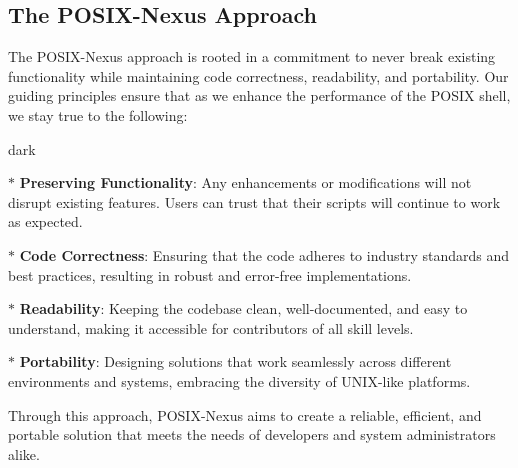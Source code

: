 \subsection{The POSIX-Nexus Approach}
The POSIX-Nexus approach is rooted in a commitment to never break existing functionality while maintaining code correctness, readability, and portability. Our guiding principles ensure that as we enhance the performance of the POSIX shell, we stay true to the following:
\bigskip
\begin{baseBoxOne}{}{dark}
    \begin{posnexItemize} 
        \item[$\ast$] \textbf{Preserving Functionality}: Any enhancements or modifications will not disrupt existing features. Users can trust that their scripts will continue to work as expected.
        \item[$\ast$] \textbf{Code Correctness}: Ensuring that the code adheres to industry standards and best practices, resulting in robust and error-free implementations.
        \item[$\ast$] \textbf{Readability}: Keeping the codebase clean, well-documented, and easy to understand, making it accessible for contributors of all skill levels.
        \item[$\ast$] \textbf{Portability}: Designing solutions that work seamlessly across different environments and systems, embracing the diversity of UNIX-like platforms.
    \end{posnexItemize}
\end{baseBoxOne}
\bigskip
Through this approach, POSIX-Nexus aims to create a reliable, efficient, and portable solution that meets the needs of developers and system administrators alike.

